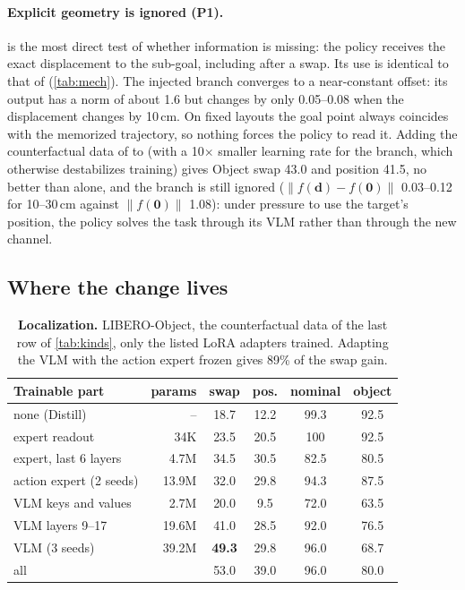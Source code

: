 \paragraph{Explicit geometry is ignored (P1).}
\pt is the most direct test of whether information is missing: the policy receives the exact displacement to the
sub-goal, including after a swap.
Its use is identical to that of \pizf (\cref{tab:mech}).
The injected branch converges to a near-constant offset: its output has a norm of about 1.6 but changes by only 0.05--0.08
when the displacement changes by 10\,cm.
On fixed layouts the goal point always coincides with the memorized trajectory, so nothing forces the policy to read it.
Adding the counterfactual data of \ours to \pt (with a 10$\times$ smaller learning rate for the branch, which otherwise
destabilizes training) gives Object swap 43.0 and position 41.5, no better than \ours alone, and the branch is still
ignored ($\lVert f(\mathbf{d}) - f(\mathbf{0}) \rVert$ 0.03--0.12 for 10--30\,cm against $\lVert f(\mathbf{0})\rVert$ 1.08):
under pressure to use the target's position, the policy solves the task through its VLM rather than through the new
channel.

\subsection{Where the change lives}
\label{sec:exp:local}

\begin{table}[t]
\centering
\small
\setlength{\tabcolsep}{3pt}
\begin{tabular}{lrcccc}
\toprule
Trainable part & params & swap & pos. & nominal & object \\
\midrule
none (Distill) & -- & 18.7 & 12.2 & 99.3 & 92.5 \\
expert readout & 34K & 23.5 & 20.5 & 100 & 92.5 \\
expert, last 6 layers & 4.7M & 34.5 & 30.5 & 82.5 & 80.5 \\
action expert (2 seeds) & 13.9M & 32.0 & 29.8 & 94.3 & 87.5 \\
VLM keys and values & 2.7M & 20.0 & 9.5 & 72.0 & 63.5 \\
VLM layers 9--17 & 19.6M & 41.0 & 28.5 & 92.0 & 76.5 \\
VLM (3 seeds) & 39.2M & \textbf{49.3} & 29.8 & 96.0 & 68.7 \\
all & & 53.0 & 39.0 & 96.0 & 80.0 \\
\bottomrule
\end{tabular}
\caption{\textbf{Localization.} LIBERO-Object, the counterfactual data of the last row of \cref{tab:kinds}, only the
listed LoRA adapters trained. Adapting the VLM with the action expert frozen gives 89\% of the swap gain.}
\label{tab:local}
\end{table}

